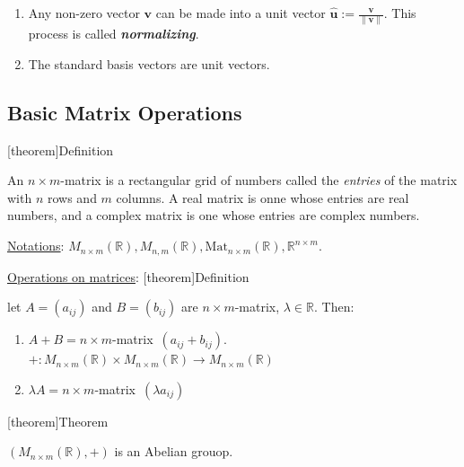 \documentclass[12pt]{report}
\theoremstyle{definition}
\begin{document}
\smallskip
\begin{ex}
    \;

    \begin{enumerate}[label = (\arabic*)]
        \item Any non-zero vector $\pmb{v}$ can be made into a unit vector
            $\hat{\pmb{u}} := \frac{\pmb{v}}{\lVert\pmb{v}\rVert}$. This process is called \textbf{\emph{normalizing}}.
        \item The standard basis vectors are unit vectors.
    \end{enumerate}
    
\end{ex}

\subsection{Basic Matrix Operations}

[theorem]{Definition}
\begin{matrix definition}
    An $n \times m$-matrix is a rectangular grid of numbers called the \emph{entries} of the matrix
    with $n$ rows and $m$ columns. A real matrix is onne whose entries are real numbers,
    and a complex matrix is one whose entries are complex numbers.

    \underline{Notations}: $M_{n \times m}(\mathbb{R}), M_{n,m}(\mathbb{R}), \mbox{Mat}_{n\times m}(\mathbb{R}), \mathbb{R}^{n\times m}$.

\end{matrix definition}

\underline{Operations on matrices}:
[theorem]{Definition}
\begin{matrices operation}
    let $A = (a_{ij})$ and $B = (b_{ij})$ are $n\times m$-matrix, $\lambda \in \mathbb{R}$. Then:
    \begin{enumerate}[label = (\arabic*)]
        \item $A+B = n\times m$-matrix $\,(a_{ij} + b_{ij})$.
            $+: M_{n \times m}(\mathbb{R}) \times M_{n \times m}(\mathbb{R}) \rightarrow M_{n \times m}(\mathbb{R})$
        \item $\lambda A = n \times m$-matrix $\,(\lambda a_{ij})$
    \end{enumerate}
    
\end{matrices operation}

[theorem]{Theorem}
\begin{addition on matrix is Abelian}
    $(M_{n \times m}(\mathbb{R}), +)$ is an Abelian grouop.
\end{addition on matrix is Abelian}
\end{document}
